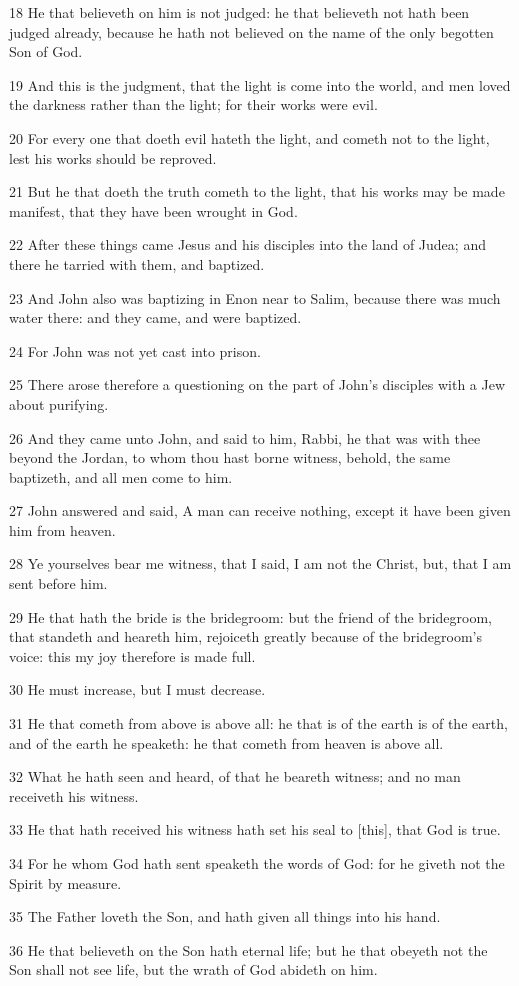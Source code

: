 \par 18 He that believeth on him is not judged: he that believeth not hath been judged already, because he hath not believed on the name of the only begotten Son of God.
\par 19 And this is the judgment, that the light is come into the world, and men loved the darkness rather than the light; for their works were evil.
\par 20 For every one that doeth evil hateth the light, and cometh not to the light, lest his works should be reproved.
\par 21 But he that doeth the truth cometh to the light, that his works may be made manifest, that they have been wrought in God.
\par 22 After these things came Jesus and his disciples into the land of Judea; and there he tarried with them, and baptized.
\par 23 And John also was baptizing in Enon near to Salim, because there was much water there: and they came, and were baptized.
\par 24 For John was not yet cast into prison.
\par 25 There arose therefore a questioning on the part of John's disciples with a Jew about purifying.
\par 26 And they came unto John, and said to him, Rabbi, he that was with thee beyond the Jordan, to whom thou hast borne witness, behold, the same baptizeth, and all men come to him.
\par 27 John answered and said, A man can receive nothing, except it have been given him from heaven.
\par 28 Ye yourselves bear me witness, that I said, I am not the Christ, but, that I am sent before him.
\par 29 He that hath the bride is the bridegroom: but the friend of the bridegroom, that standeth and heareth him, rejoiceth greatly because of the bridegroom's voice: this my joy therefore is made full.
\par 30 He must increase, but I must decrease.
\par 31 He that cometh from above is above all: he that is of the earth is of the earth, and of the earth he speaketh: he that cometh from heaven is above all.
\par 32 What he hath seen and heard, of that he beareth witness; and no man receiveth his witness.
\par 33 He that hath received his witness hath set his seal to [this], that God is true.
\par 34 For he whom God hath sent speaketh the words of God: for he giveth not the Spirit by measure.
\par 35 The Father loveth the Son, and hath given all things into his hand.
\par 36 He that believeth on the Son hath eternal life; but he that obeyeth not the Son shall not see life, but the wrath of God abideth on him.

